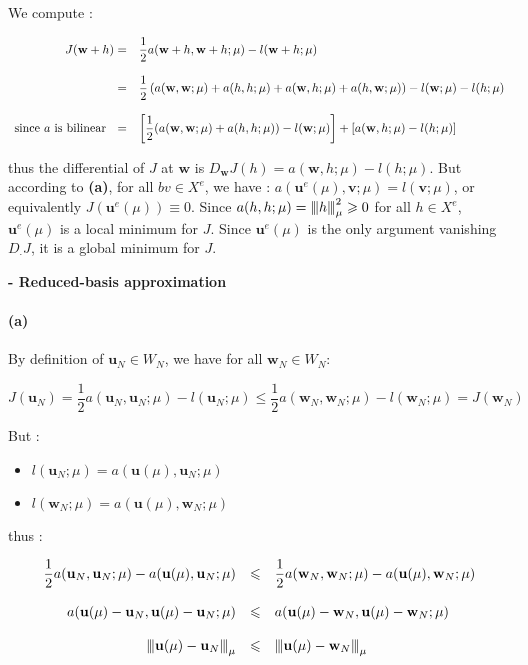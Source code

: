 \documentclass[a4paper]{article}
\newcounter{c}
\newcounter{d}
\newcounter{r}
\newcounter{e}
\newcommand{\chapitre}[1]{\stepcounter{c}\setcounter{e}{0}\setcounter{d}{0}\setcounter{r}{0}\bigskip\noindent\textbf{\Large\Roman{c} - #1}\\}
\newcommand{\vertiii}[1]{{\left\vert\kern-0.25ex\left\vert\kern-0.25ex\left\vert #1 
    \right\vert\kern-0.25ex\right\vert\kern-0.25ex\right\vert}}
\newcommand{\bu}{\mathbf u}
\newcommand{\bv}{\mathbf v}
\newcommand{\bw}{\mathbf w}
\begin{document}
We compute :

$$\begin{array}{rl}
J(\bw+h)=&\displaystyle\frac12a(\bw+h,\bw+h;\mu)-l(\bw+h;\mu)\\
&\\
=&\displaystyle\frac12\left(a(\bw,\bw;\mu)+a(h,h;\mu)+a(\bw,h;\mu)+a(h,\bw;\mu)\right)-l(\bw;\mu)-l(h;\mu)\\
&\\
\text{since $a$ is bilinear  }~\hfill=&\displaystyle\left[\frac12(a(\bw,\bw;\mu)+a(h,h;\mu))-l(\bw;\mu)\right]+\left[a(\bw,h;\mu)-l(h;\mu)\right]\\
\end{array}$$

thus the differential of $J$ at $\bw$ is $D_\bw J(h)=a(\bw,h;\mu)-l(h;\mu)$. But according to \textbf{(a)}, for all $bv\in X^e$, we have : $a(\bu^e(\mu),\bv;\mu)=l(\bv;\mu)$, or equivalently $J(\bu^e(\mu))\equiv0$. Since $a(h,h;\mu)=\vertiii h_\mu^2\geqslant0$ for all $h\in X^e$, $\bu^e(\mu)$ is a local minimum for $J$. Since $\bu^e(\mu)$ is the only argument vanishing $D_\cdot J$, it is a global minimum for $J$.

\chapitre{Reduced-basis approximation}

\paragraph{(a)}By definition of $\bu_N\in W_N$, we have for all $\bw_N\in W_N$:

$$J(\bu_N)=\frac12a(\bu_N,\bu_N;\mu)-l(\bu_N;\mu)\leqslant\frac12a(\bw_N,\bw_N;\mu)-l(\bw_N;\mu)=J(\bw_N)$$

But :
\begin{itemize}
\item$l(\bu_N;\mu)=a(\bu(\mu),\bu_N;\mu)$
\item$l(\bw_N;\mu)=a(\bu(\mu),\bw_N;\mu)$
\end{itemize}

thus :

$$\begin{array}{rcl}
\displaystyle\frac12a(\bu_N,\bu_N;\mu)-a(\bu(\mu),\bu_N;\mu)&\leqslant&\displaystyle\frac12a(\bw_N,\bw_N;\mu)-a(\bu(\mu),\bw_N;\mu)\\
&&\\
a(\bu(\mu)-\bu_N,\bu(\mu)-\bu_N;\mu)&\leqslant&a(\bu(\mu)-\bw_N,\bu(\mu)-\bw_N;\mu)\\
&&\\
\vertiii{\bu(\mu)-\bu_N}_\mu&\leqslant&\vertiii{\bu(\mu)-\bw_N}_\mu
\end{array}$$
\end{document}
